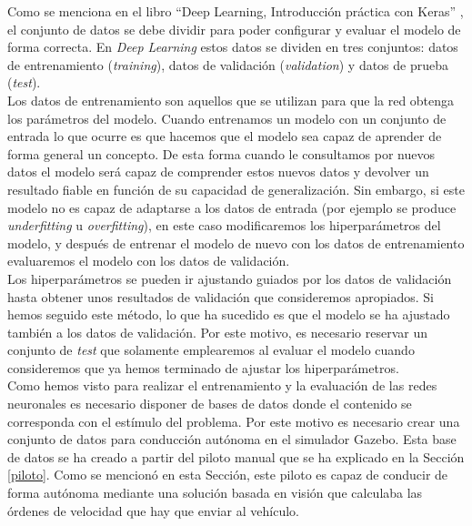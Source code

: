 Como se menciona en el libro ``Deep Learning, Introducción práctica con Keras'' \cite{Jordi_torres}, el conjunto de datos se debe dividir para poder configurar y evaluar el modelo de forma correcta. En \textit{Deep Learning} estos datos se dividen en tres conjuntos: datos de entrenamiento (\textit{training}), datos de validación (\textit{validation}) y datos de prueba (\textit{test}).\\

Los datos de entrenamiento son aquellos que se utilizan para que la red obtenga los parámetros del modelo. Cuando entrenamos un modelo con un conjunto de entrada lo que ocurre es que hacemos que el modelo sea capaz de aprender de forma general un concepto. De esta forma cuando le consultamos por nuevos datos el modelo será capaz de comprender estos nuevos datos y devolver un resultado fiable en función de su capacidad de generalización. Sin embargo, si este modelo no es capaz de adaptarse a los datos de entrada (por ejemplo se produce \textit{underfitting} u \textit{overfitting}), en este caso modificaremos los hiperparámetros del modelo, y después de entrenar el modelo de nuevo con los datos de entrenamiento evaluaremos el modelo con los datos de validación.\\

Los hiperparámetros se pueden ir ajustando guiados por los datos de validación hasta obtener unos resultados de validación que consideremos apropiados. Si hemos seguido este método, lo que ha sucedido es que el modelo se ha ajustado también a los datos de validación. Por este motivo, es necesario reservar un conjunto de \textit{test} que solamente emplearemos al evaluar el modelo cuando consideremos que ya hemos terminado de ajustar los hiperparámetros.\\

Como hemos visto para realizar el entrenamiento y la evaluación de las redes neuronales es necesario disponer de bases de datos donde el contenido se corresponda con el estímulo del problema. Por este motivo es necesario crear una conjunto de datos para conducción autónoma en el simulador Gazebo. Esta base de datos se ha creado a partir del piloto manual que se ha explicado en la Sección \ref{piloto}. Como se mencionó en esta Sección, este piloto es capaz de conducir de forma autónoma mediante una solución basada en visión que calculaba las órdenes de velocidad que hay que enviar al vehículo.\\

